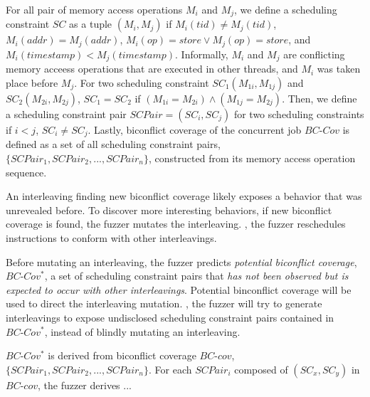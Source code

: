 For all pair of memory access operations $M_i$ and $M_j$, we define a
scheduling constraint $SC$ as a tuple $(M_i, M_j)$ if
$M_i(tid) \neq M_j(tid)$, $M_i(addr) = M_j(addr)$,
$M_i(op) = store \vee M_j(op) = store$, and
$M_i(timestamp) < M_j(timestamp)$.
%
Informally, $M_i$ and $M_j$ are conflicting memory acceess operations
that are executed in other threads, and $M_i$ was taken place before
$M_j$.
%
For two scheduling constraint $SC_1(M_{1i}, M_{1j})$ and
$SC_2(M_{2i}, M_{2j})$, $SC_1 = SC_2$ if
$(M_{1i} = M_{2i}) \wedge (M_{1j} = M_{2j})$.
%
Then, we define a scheduling constraint pair $SCPair = (SC_i, SC_j)$
for two scheduling constraints if $i < j$, $SC_i \neq SC_j$.
%
Lastly, biconflict coverage of the concurrent job $BC\mbox{-}Cov$ is
defined as a set of all scheduling constraint pairs,
$\{SCPair_1, SCPair_2, ..., SCPair_n\}$, constructed from its memory
access operation sequence.



%
An interleaving finding new biconflict coverage likely exposes a
behavior that was unrevealed before.
%
To discover more interesting behaviors, if new biconflict coverage is
found, the fuzzer mutates the interleaving. \ie, the fuzzer
reschedules instructions to conform with other interleavings.

Before mutating an interleaving, the fuzzer predicts \textit{potential
  biconflict coverage}, $BC\mbox{-}Cov^*$, a set of scheduling
constraint pairs that \textit{has not been observed but is expected to
  occur with other interleavings}.
%
Potential binconflict coverage will be used to direct the interleaving
mutation. \ie, the fuzzer will try to generate interleavings to expose
undisclosed scheduling constraint pairs contained in
$BC\mbox{-}Cov^*$, instead of blindly mutating an interleaving.


$BC\mbox{-}Cov^*$ is derived from biconflict coverage $BC\mbox{-}cov$,
$\{SCPair_1, SCPair_2, ..., SCPair_n\}$.
%
For each $SCPair_i$ composed of $(SC_x, SC_y)$ in $BC\mbox{-}cov$, the
fuzzer derives ...



